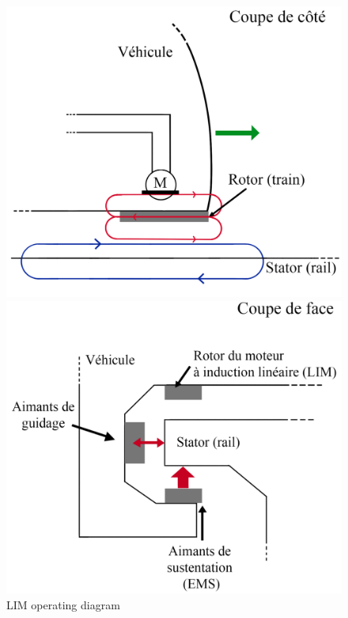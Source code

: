 \documentclass[12pt, a4paper, onecolumn]{article}
\begin{document}
\begin{figure}[H]
  \centering
  \begin{minipage}{0.45\textwidth}
    \includegraphics[width=\textwidth]
    {img/schemaLIM.png}
    \caption{LIM operating diagram}
    \label{schemaLIM}
  \end{minipage}\hfill
  \begin{minipage}{0.45\textwidth}
    \includegraphics[width=\textwidth]
    {img/schemaEMS.png}

\end{minipage}
\end{figure}
\end{document}

